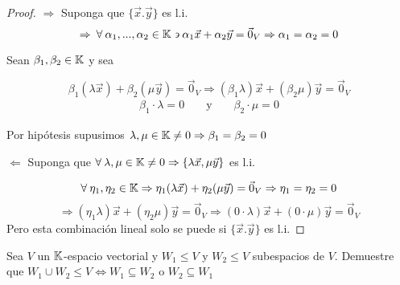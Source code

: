 \begin{proof}
    $\Rightarrow$ Suponga que $\{ \vec{x}. \vec{y} \}$ es l.i. 
    \begin{equation*}
        \Rightarrow \: \forall \: \alpha_1, ... , \alpha_2 \in  \mathbb{K} \backepsilon {\alpha}_{1}\vec{x}+{\alpha}_{2}\vec{y} = {\vec{0}}_{V} \Rightarrow {\alpha}_{1}= {\alpha}_{2} = 0
    \end{equation*}

    Sean ${\beta}_{1}, {\beta}_{2} \in \mathbb{K}$ y sea 

    \begin{equation*}
       {\beta}_{1}(\lambda \vec{x}) + {\beta}_{2}( \mu \vec{y}) = {\vec{0}}_{V} \Rightarrow ({\beta}_{1}\lambda) \vec{x} + ({\beta}_{2}\mu )\vec{y} = {\vec{0}}_{V} 
    \end{equation*}
    \begin{align*}
     {\beta}_{1} \cdot \lambda = 0  && \text{ y } &&  {\beta}_{2} \cdot \mu = 0
    \end{align*}

    Por hipótesis supusimos $\lambda, \mu \in \mathbb{K} \neq 0 \Rightarrow {\beta}_{1} = {\beta}_{2} = 0$

    $\Leftarrow$ Suponga que $\forall \: \lambda, \mu \in \mathbb{K} \neq 0 \Rightarrow \{ \lambda \vec{x}, \mu \vec{y} \}$ es l.i.

    \begin{equation*}
        \forall \: {\eta}_{1}, {\eta}_{2} \in  \mathbb{K} \Rightarrow  {\eta}_{1}(\lambda \vec{x}) + {\eta}_{2}(\mu \vec{y}) = {\vec{0}}_{V} \Rightarrow {\eta}_{1}= {\eta}_{2} = 0
    \end{equation*}
    \begin{equation*}
        \Rightarrow  ({\eta}_{1}\lambda) \vec{x} + ({\eta}_{2}\mu )\vec{y} = {\vec{0}}_{V} \Rightarrow  (0 \cdot \lambda) \vec{x} + (0 \cdot \mu )\vec{y} = {\vec{0}}_{V}
    \end{equation*}
    Pero esta combinación lineal solo se puede si $\{ \vec{x}. \vec{y} \}$ es l.i.
\end{proof}

\begin{theorem}
    
 Sea $V$ un $\mathbb{K}$-espacio vectorial y $W_1 \leq V$ y $W_2 \leq V$ subespacios de $V$. Demuestre que $W_1 \cup W_2 \leq V \Leftrightarrow W_1 \subseteq W_2$ o $W_2 \subseteq W_1$
\end{theorem}


